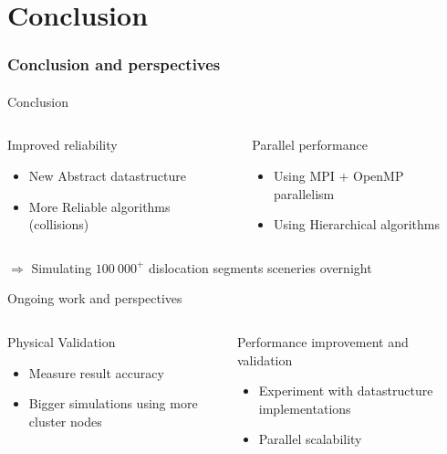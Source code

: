 \documentclass[aspectratio=1610,t,10pt]{beamer}
\begin{document}
\section*{Conclusion}

\begin{frame}
	\frametitle{Conclusion and perspectives}
	\framesubtitle{ }
	\begin{block}{Conclusion}
		\begin{columns}[t]
			\centering
		\begin{column}{0.45\linewidth}
		Improved reliability
		\begin{itemize}
			\item New Abstract datastructure
			\item More Reliable algorithms (collisions)
		\end{itemize}
		\end{column}
		\begin{column}{0.45\linewidth}
			Parallel performance
			\begin{itemize}
				\item Using MPI + OpenMP parallelism
				\item Using Hierarchical algorithms						
			\end{itemize}
		\end{column}
		\end{columns}
	\vspace{1em}
	\centering
	$\Rightarrow$ Simulating $100~000^+$ dislocation segments sceneries overnight
	\end{block}	

	\begin{block}{Ongoing work and perspectives}
		\begin{columns}[t]
			\centering
			\begin{column}{0.45\linewidth}
				Physical Validation
				\begin{itemize}
					\item Measure result accuracy
					\item Bigger simulations using more cluster nodes
				\end{itemize}
			\end{column}
			\begin{column}{0.45\linewidth}
				Performance improvement and validation
				\begin{itemize}
					\item Experiment with datastructure implementations
					\item Parallel scalability						
				\end{itemize}
			\end{column}
		\end{columns}
	\end{block}			
\end{frame}
\end{document}
